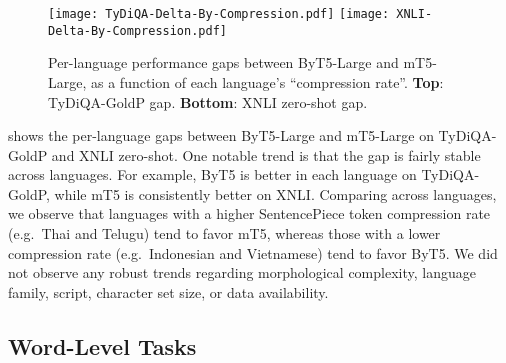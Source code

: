 \documentclass[11pt,a4paper]{article}
\begin{document}
\begin{figure}[t!]
\centering
\texttt{[image: TyDiQA-Delta-By-Compression.pdf]}
\texttt{[image: XNLI-Delta-By-Compression.pdf]}
\caption{Per-language performance gaps between ByT5-Large and mT5-Large, as a function of each language's ``compression rate''. \textbf{Top}: TyDiQA-GoldP gap. \textbf{Bottom}: XNLI zero-shot gap.}
\label{fig:gaps_by_language}
\end{figure}

 shows the per-language gaps between ByT5-Large and mT5-Large on TyDiQA-GoldP and XNLI zero-shot. One notable trend is that the gap is fairly stable across languages. For example, ByT5 is better in each language on TyDiQA-GoldP, while mT5 is consistently better on XNLI\@. Comparing across languages, we observe that languages with a higher SentencePiece token compression rate (e.g.~Thai and Telugu) tend to favor mT5, whereas those with a lower compression rate (e.g.~Indonesian and Vietnamese) tend to favor ByT5. We did not observe any robust trends regarding morphological complexity, language family, script, character set size, or data availability.

\subsection{Word-Level Tasks}
\end{document}
